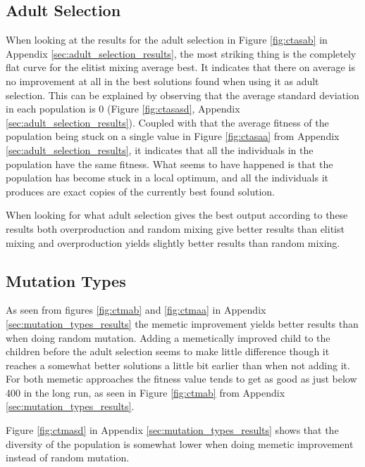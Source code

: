 \subsection{Adult Selection} %
\label{sub:adult_selection}

When looking at the results for the adult selection in Figure \ref{fig:ctasab} in Appendix \ref{sec:adult_selection_results}, the most striking thing is the completely flat curve for the elitist mixing average best. It indicates that there on average is no improvement at all in the best solutions found when using it as adult selection. This can be explained by observing that the average standard deviation in each population is 0 (Figure \ref{fig:ctasasd}, Appendix \ref{sec:adult_selection_results}). Coupled with that the average fitness of the population being stuck on a single value in Figure \ref{fig:ctasaa} from Appendix \ref{sec:adult_selection_results}, it indicates that all the individuals in the population have the same fitness. What seems to have happened is that the population has become stuck in a local optimum, and all the individuals it produces are exact copies of the currently best found solution.

When looking for what adult selection gives the best output according to these results both overproduction and random mixing give better results than elitist mixing and overproduction yields slightly better results than random mixing.

\subsection{Mutation Types} %
\label{sub:mutation_types}

As seen from figures \ref{fig:ctmab} and \ref{fig:ctmaa} in Appendix \ref{sec:mutation_types_results} the memetic improvement yields better results than when doing random mutation. Adding a memetically improved child to the children before the adult selection seems to make little difference though it reaches a somewhat better solutions a little bit earlier than when not adding it. For both memetic approaches the fitness value tends to get as good as just below 400 in the long run, as seen in Figure \ref{fig:ctmab} from Appendix \ref{sec:mutation_types_results}.

Figure \ref{fig:ctmasd} in Appendix \ref{sec:mutation_types_results} shows that the diversity of the population is somewhat lower when doing memetic improvement instead of random mutation.

